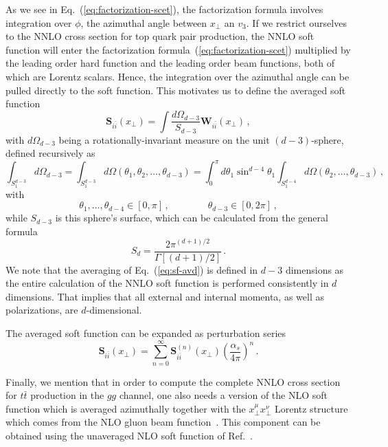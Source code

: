 \documentclass[a4paper,11pt]{article}
\newcommand{\ttbar}{\ensuremath{t \bar t}\xspace}
\newcommand{\as}{{\alpha_s}}
\newcommand{\asp}{\frac{\as}{4\pi}}
\newcommand{\bfS}{\bm{S}}
\numberwithin{equation}{section}
\begin{document}
As we see in Eq.~(\ref{eq:factorization-scet}), the factorization formula
involves integration over $\phi$, the azimuthal angle between $x_\perp$ an
$v_3$. If we restrict ourselves to the NNLO cross section for top quark pair
production, the NNLO soft function will enter the factorization
formula~(\ref{eq:factorization-scet}) multiplied by the leading order hard
function and the leading order beam functions, both of which are Lorentz
scalars.  Hence, the integration over the azimuthal angle can be pulled directly
to the soft function. This motivates us to define the averaged soft function
%
\begin{equation}
  \bfS_{i\bar i}(x_\perp) = 
  \int \frac{d\Omega_{d-3}}{S_{d-3}} \bm{W}_{i\bar i}(x_\perp)\,,
  \label{eq:sf-avd}
\end{equation}
%
with $d\Omega_{d-3}$ being a rotationally-invariant measure on the unit
$(d-3)$-sphere, defined recursively as
%
\begin{equation}
  \int_{S_1^{d-3}}\!\!\! d\Omega_{d-3} =
  \int_{S_1^{d-3}}\!\!\! d\Omega(\theta_1,\theta_2,\ldots,\theta_{d-3}) =
  \int_0^\pi\!\! d\theta_1 \sin^{d-4}\theta_1
  \int_{S_1^{d-4}}\!\!\! d\Omega(\theta_2,\ldots,\theta_{d-3})\,,
  \label{eq:rot-inv-measure}
\end{equation}
%
with
%
\begin{equation}
  \theta_1,\ldots,\theta_{d-4} \in [0,\pi]\,,\qquad \qquad
  \theta_{d-3} \in [0,2\pi]\,,
\end{equation}
%
while $S_{d-3}$ is this sphere's surface, which can be calculated from the
general formula
%
\begin{equation}
  S_{d}= \frac{2\pi^{(d+1)/2}}{\Gamma[(d+1)/2]}\,.
  \label{eq:Sd}
\end{equation}
%
We note that the averaging of Eq.~(\ref{eq:sf-avd}) is defined in $d-3$
dimensions as the entire calculation of the NNLO soft function is performed
consistently in $d$ dimensions.  That implies that all external and internal
momenta, as well as polarizations, are $d$-dimensional.

The averaged soft function can be expanded as perturbation series 
\begin{equation}
  \bfS_{i\bar i}(x_\perp) = 
  \sum_{n=0}^\infty \bfS_{i\bar i}^{(n)}(x_\perp) \left(\asp\right)^n\,.
  \label{eq:sf-expansion}
\end{equation}

Finally, we mention that in order to compute the complete NNLO cross section for
\ttbar production in the $gg$ channel, one also needs a version of the NLO soft
function which is averaged azimuthally together with the $x_\perp^\mu
x_\perp^\nu$ Lorentz structure which comes from the NLO gluon beam
function~\cite{Gehrmann:2014yya}.
%
This component can be obtained using the unaveraged NLO soft function of
Ref.~\cite{Catani:2014qha}.
\end{document}
